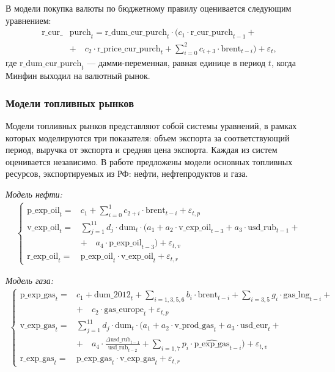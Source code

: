 \documentclass[a4paper, 14pt]{extarticle}
\newcommand{\lsum}{\sum\limits}
\begin{document}
В модели покупка валюты по бюджетному правилу оценивается следующим уравнением:
\begin{align*}
\text{r\_cur\_}&\text{purch}_t = \text{r\_dum\_cur\_purch}_t \cdot (c_1 \cdot \text{r\_cur\_purch}_{t-1} + \\
& + \quad c_2 \cdot \text{r\_price\_cur\_purch}_t + \lsum_{i=0}^2 c_{i+3} \cdot \text{brent}_{t-i}) + \varepsilon_{t},
\end{align*}
где $\text{r\_dum\_cur\_purch}_t$ — дамми-переменная, равная единице в период $t$, когда Минфин выходил на валютный рынок.

\subsubsection*{Модели топливных рынков}
Модели топливных рынков представляют собой системы уравнений, в рамках которых моделируются три показателя: объем экспорта за соответствующий период, выручка от экспорта и средняя цена экспорта.
Каждая из систем оценивается независимо.
В работе предложены модели основных топливных ресурсов, экспортируемых из РФ: нефти, нефтепродуктов и газа.
\vspace{5mm}

\textit{Модель нефти:}
\begin{align*} 
\begin{cases}
\text{p\_exp\_oil}_t =&c_1 + \lsum_{i = 0}^{1}c_{2+i} \cdot \text{brent}_{t-i} + \varepsilon_{t,p}\\
\text{v\_exp\_oil}_t =&\lsum_{j = 1}^{11} d_j \cdot \text{dum}_t \cdot(a_1 + a_2 \cdot \text{v\_exp\_oil}_{t-3} + a_3 \cdot \text{usd\_rub}_{t-1} + \\ 
&+ \quad a_4 \cdot \text{p\_exp\_oil}_{t-3}) + \varepsilon_{t,v}\\
\text{r\_exp\_oil}_t =&\text{p\_exp\_oil}_t \cdot \text{v\_exp\_oil}_t + \varepsilon_{t,r}
\end{cases}
\end{align*}

\vspace{5mm}

\textit{Модель газа:}
\begin{align*} 
	\begin{cases}
		\text{p\_exp\_gas}_t =&c_1 + \text{dum\_2012}_t {+} \lsum_{i = 1,3,5,6}b_{i} \cdot \text{brent}_{t-i} + \lsum_{i = 3, 5} g_i \cdot \text{gas\_lng}_{t-i} + \\ 
		&+ \quad c_2 \cdot \text{gas\_europe}_t + \varepsilon_{t,p} \\
		\text{v\_exp\_gas}_t =&\lsum_{j = 1}^{11} d_j \cdot \text{dum}_t \cdot(a_1 + a_2 \cdot \text{v\_prod\_gas}_{t} + a_3 \cdot \text{usd\_eur}_{t} + \\ 
		&+ \quad a_4 \cdot \frac{\Delta\text{usd\_rub}_{t-1}}{\text{usd\_rub}_{t-2}} +
		\lsum_{i = 1, 7} p_i \cdot \widehat{ \text{p\_exp\_gas}}_{t-i})+  \varepsilon_{t,v}\\
		\text{r\_exp\_gas}_t =&\text{p\_exp\_gas}_t \cdot \text{v\_exp\_gas}_t + \varepsilon_{t,r}
	\end{cases}
\end{align*}
\end{document}
